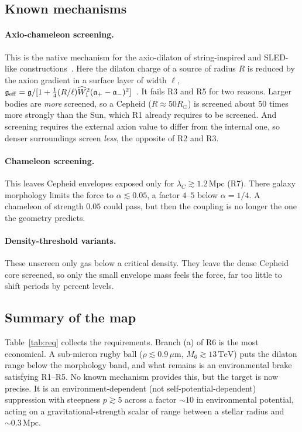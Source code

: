 \documentclass[aps,prd,reprint,superscriptaddress,nofootinbib,floatfix]{revtex4-2}
\theoremstyle{definition}
\newcommand{\Mpc}{\,\mathrm{Mpc}}
\newcommand{\um}{\,\mu\mathrm{m}}
\begin{document}
\subsection{Known mechanisms}

\paragraph*{Axio-chameleon screening.} This is the native mechanism for the axio-dilaton of string-inspired and SLED-like constructions~\cite{BBQ2023,Smith2025}. Here the dilaton charge of a source of radius $R$ is reduced by the axion gradient in a surface layer of width $\ell$, $\mathfrak g_{\rm eff}=\mathfrak g/[1+\tfrac14(R/\ell)\widehat W_1^2(\mathfrak a_+-\mathfrak a_-)^2]$~\cite{BBQ2023}. It fails R3 and R5 for two reasons. Larger bodies are \emph{more} screened, so a Cepheid ($R\approx50R_\odot$) is screened about 50 times more strongly than the Sun, which R1 already requires to be screened. And screening requires the external axion value to differ from the internal one, so denser surroundings screen \emph{less}, the opposite of R2 and R3.

\paragraph*{Chameleon screening.} This leaves Cepheid envelopes exposed only for $\lambda_C\gtrsim1.2\Mpc$ (R7). There galaxy morphology limits the force to $\alpha\lesssim0.05$, a factor $4$--$5$ below $\alpha=1/4$. A chameleon of strength $0.05$ could pass, but then the coupling is no longer the one the geometry predicts.

\paragraph*{Density-threshold variants.} These unscreen only gas below a critical density. They leave the dense Cepheid core screened, so only the small envelope mass feels the force, far too little to shift periods by percent levels.

\subsection{Summary of the map}

Table~\ref{tab:req} collects the requirements. Branch (a) of R6 is the most economical. A sub-micron rugby ball ($\rho\lesssim0.9\um$, $M_6\gtrsim13\,\mathrm{TeV}$) puts the dilaton range below the morphology band, and what remains is an environmental brake satisfying R1--R5. No known mechanism provides this, but the target is now precise. It is an environment-dependent (not self-potential-dependent) suppression with steepness $p\gtrsim5$ across a factor $\sim\!10$ in environmental potential, acting on a gravitational-strength scalar of range between a stellar radius and $\sim\!0.3\Mpc$.
\end{document}
